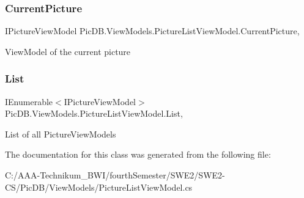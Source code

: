 \subsubsection{\texorpdfstring{Current\+Picture}{CurrentPicture}}
{\footnotesize\ttfamily I\+Picture\+View\+Model Pic\+D\+B.\+View\+Models.\+Picture\+List\+View\+Model.\+Current\+Picture\hspace{0.3cm}{\ttfamily [get]}, {\ttfamily [set]}}



View\+Model of the current picture 

\mbox{\label{class_pic_d_b_1_1_view_models_1_1_picture_list_view_model_a8889f6d5333a8d44a273776d92bba1b0}} 
\subsubsection{\texorpdfstring{List}{List}}
{\footnotesize\ttfamily I\+Enumerable$<$I\+Picture\+View\+Model$>$ Pic\+D\+B.\+View\+Models.\+Picture\+List\+View\+Model.\+List\hspace{0.3cm}{\ttfamily [get]}, {\ttfamily [set]}}



List of all Picture\+View\+Models 



The documentation for this class was generated from the following file\+:\begin{DoxyCompactItemize}
\item 
C\+:/\+A\+A\+A-\/\+Technikum\+\_\+\+B\+W\+I/fourth\+Semester/\+S\+W\+E2/\+S\+W\+E2-\/\+C\+S/\+Pic\+D\+B/\+View\+Models/Picture\+List\+View\+Model.\+cs\end{DoxyCompactItemize}
